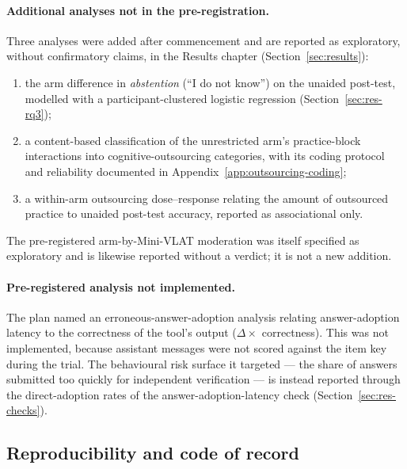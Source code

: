\paragraph{Additional analyses not in the pre-registration.} Three analyses were
added after commencement and are reported as exploratory, without confirmatory
claims, in the Results chapter (Section~\ref{sec:results}):
\begin{enumerate}
  \item the arm difference in \emph{abstention} (``I do not know'') on the
        unaided post-test, modelled with a participant-clustered logistic
        regression (Section~\ref{sec:res-rq3});
  \item a content-based classification of the unrestricted arm's practice-block
        interactions into cognitive-outsourcing categories, with its coding
        protocol and reliability documented in
        Appendix~\ref{app:outsourcing-coding};
  \item a within-arm outsourcing dose--response relating the amount of
        outsourced practice to unaided post-test accuracy, reported as
        associational only.
\end{enumerate}
The pre-registered arm-by-Mini-VLAT moderation was itself specified as
exploratory and is likewise reported without a verdict; it is not a new
addition.

\paragraph{Pre-registered analysis not implemented.} The plan named an
erroneous-answer-adoption analysis relating answer-adoption latency to the
correctness of the tool's output ($\Delta \times$ correctness). This was not
implemented, because assistant messages were not scored against the item key
during the trial. The behavioural risk surface it targeted --- the share of
answers submitted too quickly for independent verification --- is instead
reported through the direct-adoption rates of the answer-adoption-latency check
(Section~\ref{sec:res-checks}).

\subsection{Reproducibility and code of record}
\label{app:dev-repro}

